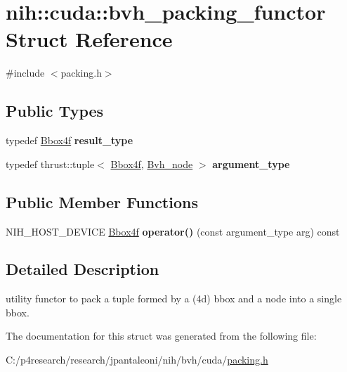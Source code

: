 \hypertarget{structnih_1_1cuda_1_1bvh__packing__functor}{
\section{nih\-:\-:cuda\-:\-:bvh\-\_\-packing\-\_\-functor \-Struct \-Reference}
\label{structnih_1_1cuda_1_1bvh__packing__functor}
}


{\ttfamily \#include $<$packing.\-h$>$}

\subsection*{\-Public \-Types}
\begin{DoxyCompactItemize}
\item 
\hypertarget{structnih_1_1cuda_1_1bvh__packing__functor_a6d857fd88aa68163eaf9239c8bc7512e}{
typedef \hyperlink{structnih_1_1_bbox}{\-Bbox4f} {\bfseries result\-\_\-type}}
\label{structnih_1_1cuda_1_1bvh__packing__functor_a6d857fd88aa68163eaf9239c8bc7512e}

\item 
\hypertarget{structnih_1_1cuda_1_1bvh__packing__functor_a58904fad03661b2124a49e3ee9c00e96}{
typedef thrust\-::tuple$<$ \hyperlink{structnih_1_1_bbox}{\-Bbox4f}, \*
\hyperlink{structnih_1_1_bvh__node}{\-Bvh\-\_\-node} $>$ {\bfseries argument\-\_\-type}}
\label{structnih_1_1cuda_1_1bvh__packing__functor_a58904fad03661b2124a49e3ee9c00e96}

\end{DoxyCompactItemize}
\subsection*{\-Public \-Member \-Functions}
\begin{DoxyCompactItemize}
\item 
\hypertarget{structnih_1_1cuda_1_1bvh__packing__functor_a9648db88afadee8682039c1d94fb8628}{
\-N\-I\-H\-\_\-\-H\-O\-S\-T\-\_\-\-D\-E\-V\-I\-C\-E \hyperlink{structnih_1_1_bbox}{\-Bbox4f} {\bfseries operator()} (const argument\-\_\-type arg) const }
\label{structnih_1_1cuda_1_1bvh__packing__functor_a9648db88afadee8682039c1d94fb8628}

\end{DoxyCompactItemize}


\subsection{\-Detailed \-Description}
utility functor to pack a tuple formed by a (4d) bbox and a node into a single bbox. 

\-The documentation for this struct was generated from the following file\-:\begin{DoxyCompactItemize}
\item 
\-C\-:/p4research/research/jpantaleoni/nih/bvh/cuda/\hyperlink{packing_8h}{packing.\-h}\end{DoxyCompactItemize}
